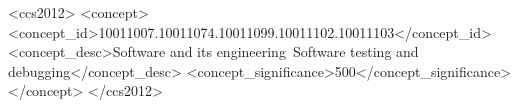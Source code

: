 \documentclass[format=sigconf]{acmart}
\begin{document}
\begin{CCSXML}
<ccs2012>
<concept>
<concept_id>10011007.10011074.10011099.10011102.10011103</concept_id>
<concept_desc>Software and its engineering~Software testing and debugging</concept_desc>
<concept_significance>500</concept_significance>
</concept>
</ccs2012>
\end{CCSXML}


\maketitle














%




\end{document}
